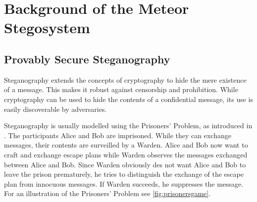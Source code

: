 \chapter{Background of the Meteor Stegosystem}
\label{chap:previous-work}

\section{Provably Secure Steganography}
\label{sec:prov-sec-steg}

Steganography extends the concepts of cryptography to hide the mere existence of a message.
This makes it robust against censorship and prohibition.
While cryptography can be used to hide the contents of a confidential message, its use is easily discoverable by adversaries.


Steganography is usually modelled using the Prisoners' Problem, as introduced in \cite{Simmons1983}.
The participants Alice and Bob are imprisoned.
While they can exchange messages, their contents are surveilled by a Warden.
Alice and Bob now want to craft and exchange escape plans while Warden observes the messages exchanged between Alice and Bob.
Since Warden obviously des not want Alice and Bob to leave the prison prematurely, he tries to distinguish the exchange of the escape plan from innocuous messages.
If Warden succeeds, he suppresses the message.
For an illustration of the Prisoners' Problem see \autoref{fig:prisonersgame}.

